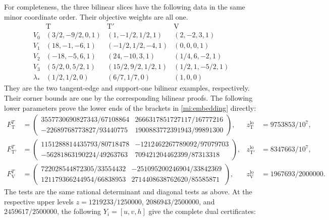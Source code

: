 For completeness, the three bilinear slices have the following data in
the same minor coordinate order. Their objective weights are all one.
\[
\begin{array}{c|c|c|c}
&\mathrm T&\mathrm T'&\mathrm V\\\hline
V_0&(3/2,-9/2,0,1)&(1,-1/2,1/2,1)&(2,-2,3,1)\\
V_1&(18,-1,-6,1)&(-1/2,1/2,-4,1)&(0,0,0,1)\\
V_2&(-18,-5,6,1)&(24,-10,3,1)&(1/4,6,-2,1)\\
V_3&(5/2,0,5/2,1)&(15/2,9/2,1/2,1)&(1/2,1,-5/2,1)\\
\lambda_*&(1/2,1/2,0)&(6/7,1/7,0)&(1,0,0)
\end{array}
\]
They are the two tangent-edge and support-one bilinear examples,
respectively. Their corner bounds are one by the corresponding bilinear
proofs. The following lower parameters prove the lower ends of the
brackets in \cref{mi:embedding} directly:
\begin{align*}
F_{\mathrm T}^T&=
\begin{pmatrix}3557730690827343/67108864&2666317851727117/16777216\\
-22689768773827/93440775&1900883772391943/99891300\end{pmatrix},
&z_{\mathrm T}^{\mathrm{lo}}&=9753853/10^7,\\
F_{\mathrm T'}^T&=
\begin{pmatrix}1151288814435793/80718478&-1212462267789092/97079703\\
-56281863190224/49263763&709421204462399/87313318\end{pmatrix},
&z_{\mathrm T'}^{\mathrm{lo}}&=8347663/10^7,\\
F_{\mathrm V}^T&=
\begin{pmatrix}722028544872305/33554432&-251095200246904/33842369\\
121179366244954/66838953&2714408638762620/85585871\end{pmatrix},
&z_{\mathrm V}^{\mathrm{lo}}&=1967693/2000000.
\end{align*}
The tests are the same rational determinant and diagonal tests as above.
At the respective upper levels
$z=1219233/1250000$, $2086943/2500000$, and $2459617/2500000$,
the following $Y_i=[u,v,h]$ give the complete dual certificates:
